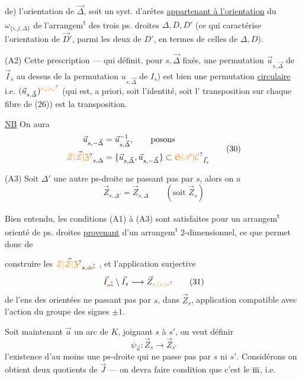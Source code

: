 de) l'orientation de $\vec\Delta$, soit un syst. 
d'arêtes \uline{appartenant à l'orientation} du 
$\omega_{\{i,j,\Delta\}}$ de l'arrangem\textsuperscript{t} des trois ps. droites
$\Delta,D,D'$ (ce qui caractérise l'orientation de
$\vec D'$, parmi les deux de $D'$, en termes de
celles de $\Delta,D$).

(A2) Cette prescription — qui définit,  pour
$s,\vec\Delta$ fixés, une permutation $\vec u_{s,\vec\Delta}$ de $\vec I_s$
au dessus de la permutation $u_{s,\vec\Delta}$ de $I_s$)
est bien une permutation \uline{circulaire}
 i.e. $(\vec u_{s,\vec\Delta})^{\unsure{\nu_s|v_s}}$ (qui est, 
a priori, soit l'identité, soit l' transposition
sur chaque fibre de (26))  est la transposition.

\uline{NB} On aura 
\[\begin{aligned}\vec u_{s,-\vec\Delta}&=\vec u_{s,\vec\Delta}^{-1},\qquad\text{posons}\\
\vec{\unsure{Z|\mathcal Z|\mathfrak Z}}_{s,\Delta}&=\{\vec u_{s,\vec\Delta},\vec u_{s,-\vec\Delta}\}\subset{\unsure{\mathfrak S|\mathscr S|\mathcal C}}_{\vec I_s}
\end{aligned}\tag*{(30)}\]

(A3) Soit $\Delta'$ une autre ps-droite ne passant pas
par $s$, alors on a
\[\vec Z_{s,\Delta'}=\vec Z_{s,\Delta}\qquad(\text{soit }\vec Z_s)\]

Bien entendu, les conditions (A1) à (A3)
sont satisfaites pour un arrangem\textsuperscript{t}  orienté
de ps. droites \uline{provenant} d'un arrangem\textsuperscript{t} 2-dimensionnel,
ce que permet donc de

construire les $\vec{\unsure{Z|\mathcal Z|\mathfrak Z}}_{s,\deleted{\unsure{\Delta}}}$ , et l'application
surjective
\[\vec I_{\deleted{\unsure{s}}}\setminus\vec I_s\longrightarrow\vec Z_{\unsure{s,|s;|s}}\tag*{(31)}\]
de l'ens des  orientées ne passant pas
par $s$, dans $\vec Z_s$, application compatible avec
l'action du groupe des signes $\pm1$.

Soit maintenant $\vec a$ un arc de
$K$, joignant $s$ à $s'$, on veut définir
\[\psi_{\vec a}:\vec Z_s\longrightarrow\vec Z_{s'}\]
  l'existence
d'au moins une ps-droite qui ne passe
pas par $s$ ni $s'$. Considérons
on obtient deux quotients de $\vec J$ — on
devra faire condition que c'est le $\overline{\textrm m}$, i.e.


